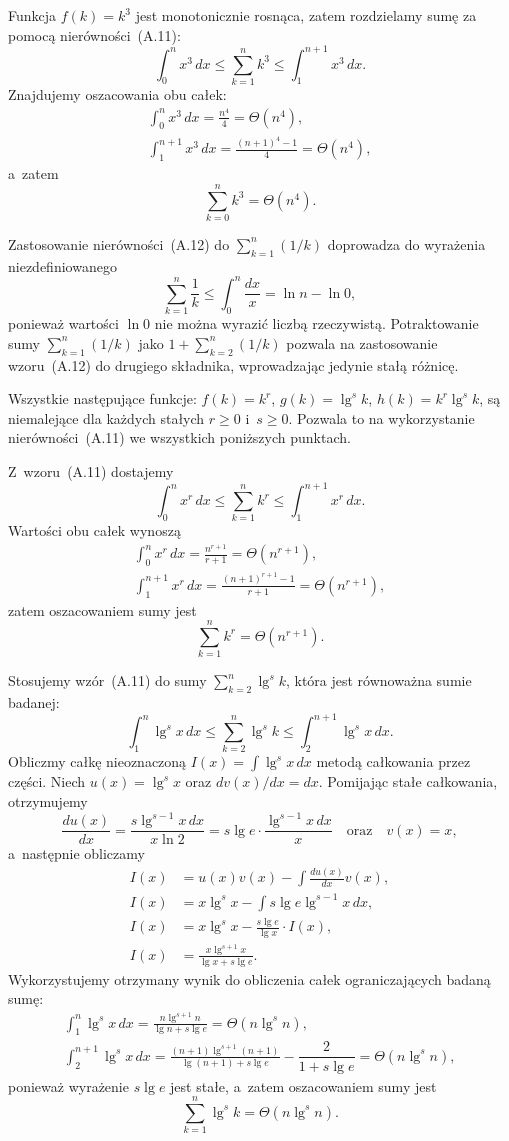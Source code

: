 \exercise %
Funkcja $f(k)=k^3$ jest monotonicznie rosnąca, zatem rozdzielamy sumę za pomocą nierówności~(A.11):
\[
	\int_0^nx^3\,dx \le \sum_{k=1}^nk^3 \le \int_1^{n+1}x^3\,dx.
\]
Znajdujemy oszacowania obu całek:
\begin{gather*}
	\int_0^nx^3\,dx = \frac{n^4}{4} = \Theta(n^4), \\[2mm]
	\int_1^{n+1}x^3\,dx = \frac{(n+1)^4-1}{4} = \Theta(n^4),
\end{gather*}
a~zatem
\[
	\sum_{k=0}^nk^3 = \Theta(n^4).
\]

\exercise %
Zastosowanie nierówności~(A.12) do $\sum_{k=1}^n(1/k)$ doprowadza do wyrażenia niezdefiniowanego
\[
	\sum_{k=1}^n\frac{1}{k} \le \int_0^n\frac{dx}{x} = \ln n-\ln0,
\]
ponieważ wartości $\ln0$ nie można wyrazić liczbą rzeczywistą. Potraktowanie sumy $\sum_{k=1}^n(1/k)$ jako $1+\sum_{k=2}^n(1/k)$ pozwala na zastosowanie wzoru~(A.12) do drugiego składnika, wprowadzając jedynie stałą różnicę.

\problems

Wszystkie następujące funkcje: $f(k)=k^r$, $g(k)=\lg^sk$, $h(k)=k^r\lg^sk$, są niemalejące dla każdych stałych $r\ge0$ i~$s\ge0$. Pozwala to na wykorzystanie nierówności~(A.11) we wszystkich poniższych punktach.

\subproblem %
Z~wzoru~(A.11) dostajemy
\[
	\int_0^nx^r\,dx \le \sum_{k=1}^nk^r \le \int_1^{n+1}x^r\,dx.
\]
Wartości obu całek wynoszą
\begin{gather*}
	\int_0^nx^r\,dx = \frac{n^{r+1}}{r+1} = \Theta(n^{r+1}), \\[2mm]
	\int_1^{n+1}x^r\,dx = \frac{(n+1)^{r+1}-1}{r+1} = \Theta(n^{r+1}),
\end{gather*}
zatem oszacowaniem sumy jest
\[
	\sum_{k=1}^nk^r = \Theta(n^{r+1}).
\]

\subproblem %
Stosujemy wzór~(A.11) do sumy $\sum_{k=2}^n\lg^sk$, która jest równoważna sumie badanej:
\[
	\int_1^n\lg^sx\,dx \le \sum_{k=2}^n\lg^sk \le \int_2^{n+1}\lg^sx\,dx.
\]
Obliczmy całkę nieoznaczoną $I(x) = \int\lg^sx\,dx$ metodą całkowania przez części. Niech $u(x)=\lg^sx$ oraz $dv(x)/dx=dx$. Pomijając stałe całkowania, otrzymujemy
\[
	\frac{du(x)}{dx} = \frac{s\lg^{s-1}x\,dx}{x\ln 2} = s\lg e\cdot\frac{\lg^{s-1}x\,dx}{x} \quad\text{oraz}\quad v(x) = x,
\]
a~następnie obliczamy
\begin{align*}
	I(x) &= u(x)v(x)-\int\frac{du(x)}{dx}v(x), \\
	I(x) &= x\lg^sx-\int s\lg e\lg^{s-1}x\,dx, \\
	I(x) &= x\lg^sx-\frac{s\lg e}{\lg x}\cdot I(x), \\
	I(x) &= \frac{x\lg^{s+1}x}{\lg x+s\lg e}.
\end{align*}
Wykorzystujemy otrzymany wynik do obliczenia całek ograniczających badaną sumę:
\begin{gather*}
	{\int_1^n\lg^sx\,dx} = \frac{n\lg^{s+1}n}{\lg n+s\lg e} = \Theta(n\lg^sn), \\[2mm]
	{\int_2^{n+1}\lg^sx\,dx} = \frac{(n+1)\lg^{s+1}(n+1)}{\lg(n+1)+s\lg e}-\dfrac{2}{1+s\lg e} = \Theta(n\lg^sn),
\end{gather*}
ponieważ wyrażenie $s\lg e$ jest stałe, a~zatem oszacowaniem sumy jest
\[
	\sum_{k=1}^n\lg^sk = \Theta(n\lg^sn).
\]

